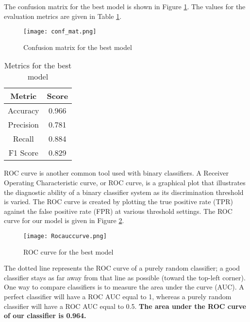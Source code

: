 \documentclass[conference]{IEEEtran}
\begin{document}
The confusion matrix for the best model is shown in Figure \ref{conf_mat}. The values for the evaluation metrics are given in Table \ref{met}.

\begin{figure}[tbh]
\centering
\texttt{[image: conf\_mat.png]}
\caption{Confusion matrix for the best model}
\label{conf_mat}
\end{figure}

\begin{table}
\begin{center}

\caption{Metrics for the best model}

\begin{tabular}{| c| c| }
 \hline
 Metric & Score \\
 \hline
 \hline
 Accuracy & 0.966 \\ 
 \hline
 Precision & 0.781 \\   
 \hline
 Recall & 0.884 \\
 \hline
 F1 Score & 0.829 \\
 \hline

\end{tabular}

\label{met}
\end{center}

\end{table}

ROC curve is another common tool used with binary classifiers. A Receiver Operating Characteristic curve, or ROC curve, is a graphical plot that illustrates the diagnostic ability of a binary classifier system as its discrimination threshold is varied. The ROC curve is created by plotting the true positive rate (TPR) against the false positive rate (FPR) at various threshold settings. The ROC curve for our model is given in Figure \ref{Rocauccurve}.

\begin{figure}[tbh]
\centering
\texttt{[image: Rocauccurve.png]}
\caption{ROC curve for the best model}
\label{Rocauccurve}
\end{figure}

The dotted line represents the ROC curve of a purely random classifier; a good classifier stays as far away from that line as possible (toward the top-left corner). One way to compare classifiers is to measure the area under the curve (AUC). A perfect classifier will have a ROC AUC equal to 1, whereas a purely random classifier will have a ROC AUC equal to 0.5. \textbf{The area under the ROC curve of our classifier is 0.964.}
\end{document}
